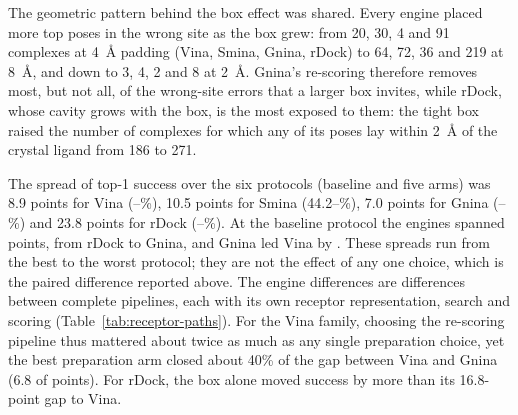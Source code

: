 The geometric pattern behind the box effect was shared. Every engine placed more top poses in
the wrong site as the box grew: from 20, 30, 4 and 91 complexes at \SI{4}{\angstrom}
padding (Vina, Smina, Gnina, rDock) to 64, 72, 36 and 219 at \SI{8}{\angstrom}, and down
to 3, 4, 2 and 8 at \SI{2}{\angstrom}. Gnina's re-scoring therefore removes most, but not
all, of the wrong-site errors that a larger box invites, while rDock, whose cavity grows
with the box, is the most exposed to them: the tight box raised the number of complexes for
which any of its poses lay within \SI{2}{\angstrom} of the crystal ligand from 186 to 271.

The spread of top-1 success over the six protocols (baseline and five arms) was 8.9 points for Vina
(--\%), 10.5 points for Smina (44.2--\%), 7.0 points for Gnina
(--\%) and 23.8 points for rDock (--\%). At the baseline protocol the
engines spanned  points, from rDock to Gnina, and Gnina led Vina by . These spreads
run from the best to the worst protocol; they are not the effect of any one choice, which is
the paired difference reported above. The engine differences are differences between complete
pipelines, each with its own receptor representation, search and scoring
(Table~\ref{tab:receptor-paths}). For the Vina family, choosing the re-scoring pipeline
thus mattered about twice as much as any single preparation choice, yet the best preparation arm closed about 40\% of the gap between Vina
and Gnina (6.8 of  points). For rDock, the box alone moved success by more than its
16.8-point gap to Vina.

